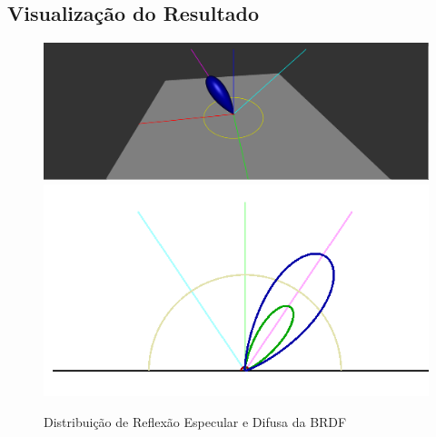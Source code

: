 \subsection{Visualização do Resultado}
\begin{figure}[H]
    \caption{\small{Distribuição de Reflexão Especular e Difusa da BRDF}}\label{fig-cook-torrance-plots}
    \vspace{42px}
  \includegraphics[width=\linewidth]{./Imagens/brdfs/cook-torrance-3D-plot}
\endminipage\hfill
{}
  \includegraphics[width=\linewidth]{./Imagens/brdfs/cook-torrance-polar-plot-log.png}
\endminipage\hfill
\end{figure}

